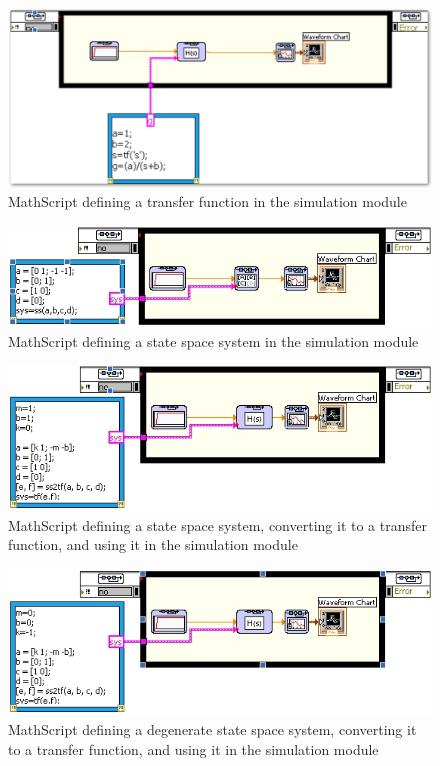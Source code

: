 \begin{figure}[h!]
\centering
\includegraphics[width=6in]{mathscriptinsim/mathscriptinsimTF}
\caption{MathScript defining a transfer function in the simulation module}
\label{fig-mathscriptinsimTF}
\end{figure}

\begin{figure}[h!]
\centering
\includegraphics[width=6in]{mathscriptinsim/mathscriptinsimSS}
\caption{MathScript defining a state space system in the simulation module}
\label{fig-mathscriptinsimSS}
\end{figure}

\begin{figure}[h!]
\centering
\includegraphics[width=6in]{mathscriptinsim/mathscriptinsimSS2TF}
\caption{MathScript defining a state space system, converting it to a transfer
  function, and using it in the simulation module}
\label{fig-mathscriptinsimSS2TF}
\end{figure}

\begin{figure}[h!]
\centering
\includegraphics[width=6in]{mathscriptinsim/mathscriptinsimSS2TFdegenerate}
\caption{MathScript defining a degenerate state space system, converting it to a transfer
  function, and using it in the simulation module}
\label{fig-mathscriptinsimSS2TFdeg}
\end{figure}


 



